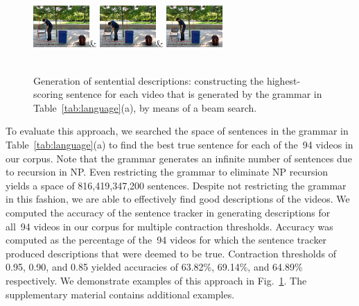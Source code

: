 \begin{figure}
\begin{tabular}
    \includegraphics[width=0.19\textwidth]{images/generation1-0006}&
    \includegraphics[width=0.19\textwidth]{images/generation1-0008}&
    \includegraphics[width=0.19\textwidth]{images/generation1-0010}\\
    \\
  \end{tabular}
  \vspace*{-2ex}
  \caption{Generation of sentential descriptions: constructing the
    highest-scoring sentence for each video that is generated by the grammar in
    Table~\protect\ref{tab:language}(a), by means of a beam search.}
  \label{fig:generation}
  \vspace*{-4ex}
\end{figure}

To evaluate this approach, we searched the space of sentences in the grammar in
Table~\ref{tab:language}(a) to find the best true sentence for each of the~94
videos in our corpus.
%
Note that the grammar generates an infinite number of sentences due to
recursion in NP.\@
%
Even restricting the grammar to eliminate NP recursion yields a space of
816,419,347,200 sentences.
%
Despite not restricting the grammar in this fashion, we are able to effectively
find good descriptions of the videos.
%
We computed the accuracy of the sentence tracker in generating descriptions for
all~94 videos in our corpus for multiple contraction thresholds.
%
Accuracy was computed as the percentage of the~94 videos for which the
sentence tracker produced descriptions that were deemed to be true.
%
Contraction thresholds of 0.95, 0.90, and 0.85 yielded accuracies of
63.82\%, 69.14\%, and 64.89\% respectively.
%
We demonstrate examples of this approach in Fig.~\ref{fig:generation}.
%
The supplementary material contains additional examples.

